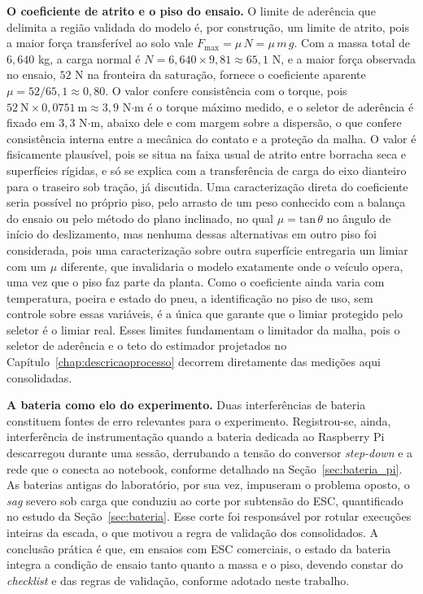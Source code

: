 \textbf{O coeficiente de atrito e o piso do ensaio.} O limite de aderência que delimita a
região validada do modelo é, por construção, um limite de atrito, pois a maior força
transferível ao solo vale $F_{\max} = \mu\,N = \mu\,m\,g$. Com a massa
total de $6{,}640$ kg, a carga normal é $N = 6{,}640 \times 9{,}81 \approx 65{,}1$ N, e a
maior força observada no ensaio, $52$ N na fronteira da saturação, fornece o coeficiente
aparente $\mu = 52/65{,}1 \approx 0{,}80$. O valor confere consistência com o torque, pois
$52\ \mathrm{N} \times 0{,}0751\ \mathrm{m} \approx 3{,}9$ N$\cdot$m é o torque máximo
medido, e o seletor de aderência é fixado em $3{,}3$ N$\cdot$m, abaixo dele e com margem
sobre a dispersão, o que confere consistência interna entre a mecânica do contato e a
proteção da malha. O valor é fisicamente plausível, pois se situa na
faixa usual de atrito entre borracha seca e superfícies rígidas, e só se explica com a
transferência de carga do eixo dianteiro para o traseiro sob tração, já discutida. Uma
caracterização direta do coeficiente seria possível no próprio piso, pelo arrasto de um
peso conhecido com a balança do ensaio ou pelo método do plano inclinado, no qual
$\mu = \mathrm{tan}\,\theta$ no ângulo de início do deslizamento, mas nenhuma dessas
alternativas em outro piso foi considerada, pois uma caracterização sobre outra superfície
entregaria um limiar com um $\mu$ diferente, que invalidaria o modelo exatamente onde o
veículo opera, uma vez que o piso faz parte da planta. Como o coeficiente ainda varia com
temperatura, poeira e estado do pneu, a identificação no piso de uso, sem controle sobre
essas variáveis, é a única que garante que o limiar protegido pelo seletor é o limiar
real. Esses limites fundamentam o limitador da malha, pois o seletor de
aderência e o teto do estimador projetados no Capítulo~\ref{chap:descricaoprocesso}
decorrem diretamente das medições aqui consolidadas.

\textbf{A bateria como elo do experimento.} Duas interferências de bateria constituem
fontes de erro relevantes para o experimento. Registrou-se, ainda, interferência de
instrumentação quando a bateria dedicada ao Raspberry Pi descarregou durante uma sessão,
derrubando a tensão do conversor \emph{step-down} e a rede que o conecta ao notebook,
conforme detalhado na Seção~\ref{sec:bateria_pi}. As baterias antigas do laboratório, por sua
vez, impuseram o problema oposto, o \emph{sag} severo sob carga que conduziu ao corte por
subtensão do ESC, quantificado no estudo da Seção~\ref{sec:bateria}. Esse corte foi
responsável por rotular execuções inteiras da escada, o que motivou a regra de validação dos
consolidados.
A conclusão prática é que, em ensaios com ESC comerciais, o estado da bateria integra a
condição de ensaio tanto quanto a massa e o piso, devendo constar do \emph{checklist} e das
regras de validação, conforme adotado neste trabalho.

